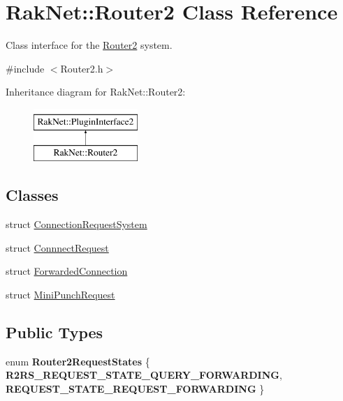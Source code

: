 \hypertarget{class_rak_net_1_1_router2}{\section{Rak\-Net\-:\-:Router2 Class Reference}
\label{class_rak_net_1_1_router2}
}


Class interface for the \hyperlink{class_rak_net_1_1_router2}{Router2} system.  




{\ttfamily \#include $<$Router2.\-h$>$}

Inheritance diagram for Rak\-Net\-:\-:Router2\-:\begin{figure}[H]
\begin{center}
\leavevmode
\includegraphics[height=2.000000cm]{class_rak_net_1_1_router2}
\end{center}
\end{figure}
\subsection*{Classes}
\begin{DoxyCompactItemize}
\item 
struct \hyperlink{struct_rak_net_1_1_router2_1_1_connection_request_system}{Connection\-Request\-System}
\item 
struct \hyperlink{struct_rak_net_1_1_router2_1_1_connnect_request}{Connnect\-Request}
\item 
struct \hyperlink{struct_rak_net_1_1_router2_1_1_forwarded_connection}{Forwarded\-Connection}
\item 
struct \hyperlink{struct_rak_net_1_1_router2_1_1_mini_punch_request}{Mini\-Punch\-Request}
\end{DoxyCompactItemize}
\subsection*{Public Types}
\begin{DoxyCompactItemize}
\item 
enum {\bfseries Router2\-Request\-States} \{ {\bfseries R2\-R\-S\-\_\-\-R\-E\-Q\-U\-E\-S\-T\-\_\-\-S\-T\-A\-T\-E\-\_\-\-Q\-U\-E\-R\-Y\-\_\-\-F\-O\-R\-W\-A\-R\-D\-I\-N\-G}, 
{\bfseries R\-E\-Q\-U\-E\-S\-T\-\_\-\-S\-T\-A\-T\-E\-\_\-\-R\-E\-Q\-U\-E\-S\-T\-\_\-\-F\-O\-R\-W\-A\-R\-D\-I\-N\-G}
 \}
\end{DoxyCompactItemize}
